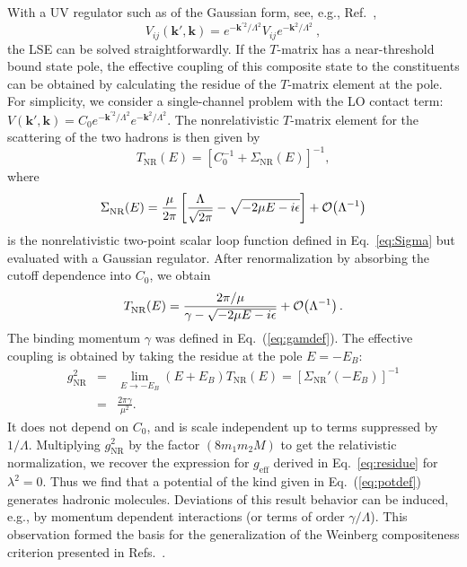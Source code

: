 With a UV regulator such as of the Gaussian form, see, 
e.g., Ref.~\cite{Epelbaum:2008ga}, 
\begin{equation}
  V_{ij}(\bm k',\bm k) =  e^{-\bm k^{\prime2}/\Lambda^2} V_{ij} e^{-\bm 
k^{2}/\Lambda^2} \ ,
\label{eq:potdef}
\end{equation}
the LSE can be solved straightforwardly.  
If the $T$-matrix has a near-threshold bound state pole, the effective coupling 
of this composite state to the constituents can be obtained by calculating the 
residue of the $T$-matrix element at the pole. For simplicity, we consider a 
single-channel problem with the LO contact term: $V(\bm k',\bm k) 
= C_0 e^{-\bm k^{\prime2}/\Lambda^2} e^{-\bm 
k^{2}/\Lambda^2}$. The nonrelativistic $T$-matrix element for the scattering of 
the two hadrons is then given by 
\begin{equation}
T_\text{NR}^{}(E) = \left[ C_0^{-1} + \Sigma_\text{NR}^{}(E) \right]^{-1}, 
\label{eq:T1c}
\end{equation}
where 
\begin{equation}
\Sigma_\text{NR}^{}(E)= \frac{\mu}{2\pi} \left[\frac{\Lambda}{\sqrt{2\pi}} 
- \sqrt{-2\mu E-i\epsilon} \right] +\mathcal{O}\!\left( {\Lambda}^{-1} \right)\!\,
\label{eq:SigmaGaussian}
\end{equation}
is the nonrelativistic two-point scalar loop function 
defined in Eq.~\eqref{eq:Sigma} but evaluated with a Gaussian regulator. After 
renormalization by absorbing the cutoff dependence into $C_0$, we obtain
\begin{equation}
  T_\text{NR}^{}(E)=\frac{2\pi/\mu}{\gamma -\sqrt{-2\mu E-i\epsilon} } +\mathcal{O}\!\left( 
{\Lambda}^{-1} \right)\!\, .
  \label{eq:TNR}
\end{equation}
The binding momentum $\gamma$ was defined in Eq.~(\ref{eq:gamdef}).
The 
effective coupling is obtained by taking the residue at the pole $E=-E_B$:
\begin{eqnarray}
  g_\text{NR}^2 &=& \lim_{E\to -E_B} (E+E_B) T_\text{NR}^{}(E) = \left[  
\Sigma_\text{NR}'(-E_B) \right]^{-1} \nonumber\\
  &=& \frac{2\pi\gamma}{\mu^2} .
  \label{eq:gNR}
\end{eqnarray}
It does not depend on $C_0$, and is scale independent up to terms suppressed by 
$1/\Lambda$.
Multiplying $g_\text{NR}^2$ by the factor $(8 m_1 m_2 M)$ to get the 
relativistic  
normalization, we recover the expression for $g_\text{eff}$ derived in 
Eq.~\eqref{eq:residue} for  
 $\lambda^2=0$. Thus we find that a potential of the
kind given in Eq.~(\ref{eq:potdef}) generates hadronic molecules.
Deviations of this result behavior can be induced, e.g., by momentum
dependent interactions (or terms of order $\gamma/\Lambda$). This
observation formed the basis for the generalization of the Weinberg 
compositeness criterion presented in 
Refs.~\cite{Aceti:2012dd,Hyodo:2011qc,Hyodo:2013nka,Sekihara:2014kya}.

